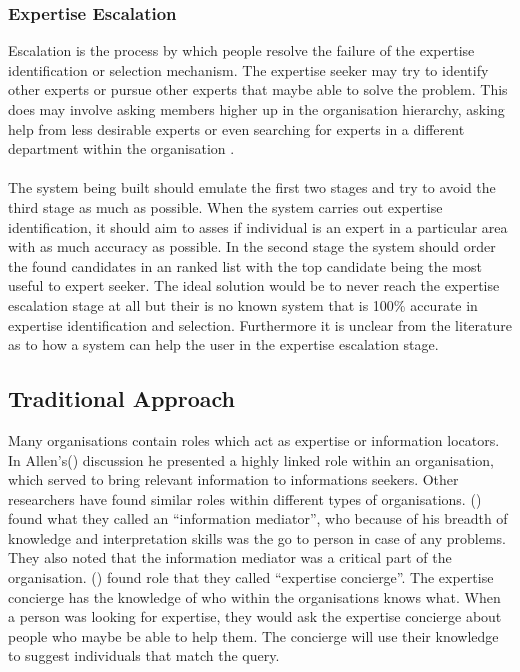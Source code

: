 \documentclass[a4paper,oneside,11pt]{report}
\begin{document}
\subsubsection{Expertise Escalation} 
Escalation is the process by which people resolve the failure of the expertise identification or selection mechanism. The expertise seeker may try to identify other experts or pursue other experts that maybe able to solve the problem.  This does may involve asking members higher up in the organisation hierarchy, asking help from less desirable experts or even searching for experts in a different department within the organisation \autocite{mcdonalackerman1998}.
\\
\\
The system being built should emulate the first two stages and try to avoid the third stage as much as possible. When the system carries out expertise identification, it should aim to asses if individual is an expert in a particular area with as much accuracy as possible. In the second stage the system should order the found candidates in an ranked list with the top candidate being the most useful to expert seeker. The ideal solution would be to never reach the expertise escalation stage at all but their is no known system that is 100\% accurate in expertise identification and selection. Furthermore it is unclear from the literature as to how a system can help the user in the expertise escalation stage.

\subsection{Traditional Approach}
Many organisations contain roles which act as expertise or information locators.
In Allen's(\citeyear{allen1977}) discussion he presented a highly linked role within an organisation, which served to bring relevant information to informations seekers. Other researchers have found similar roles within different types of organisations. \citeauthor{ehrlichcash1994}(\citeyear{ehrlichcash1994}) found what they called an \enquote{information mediator}, who because of his breadth of knowledge and interpretation skills was the go to person in case of any problems. They also noted that the information mediator was a critical part of the organisation. \citeauthor{mcdonalackerman1998}(\citeyear{mcdonalackerman1998}) found role that they called \enquote{expertise concierge}. The expertise concierge has the knowledge of who within the organisations knows what. When a person was looking for expertise, they would ask the expertise concierge about people who maybe be able to help them. The concierge will use their knowledge to suggest individuals that match the query.
\end{document}
